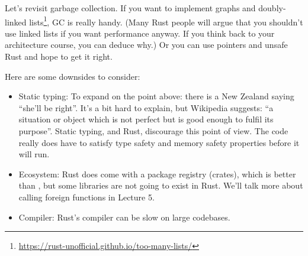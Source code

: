 Let's revisit garbage collection. If you want
to implement graphs and doubly-linked lists\footnote{\url{https://rust-unofficial.github.io/too-many-lists/}}, GC is really handy. (Many
Rust people will argue that you shouldn't use linked lists if you want
performance anyway. If you think back to your architecture course, you
can deduce why.) Or you can use pointers and unsafe Rust and hope to
get it right.


Here are some downsides to consider:
\begin{itemize}
\item Static typing: To expand on the point above: there is a New Zealand saying ``she'll be right''. It's a bit hard to explain, but Wikipedia suggests: ``a situation or object which is not perfect but is good enough to fulfil its purpose''. Static typing, and Rust, discourage this point of view. The code really does have to satisfy type safety and memory safety properties before it will run.
\item Ecosystem: Rust does come with a package registry (crates), which is better than \CPP, but some libraries are not going to exist in Rust. We'll talk more about calling foreign functions in Lecture 5.
\item Compiler: Rust's compiler can be slow on large codebases.
\end{itemize}





